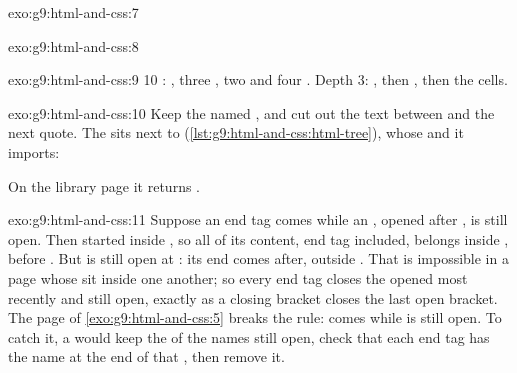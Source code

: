 \begin{solution}{exo:g9:html-and-css:7}
\label{lst:g9:html-and-css:sol-places}
\end{solution}

\begin{solution}{exo:g9:html-and-css:8}
\label{lst:g9:html-and-css:sol-h2}
\end{solution}

\begin{solution}{exo:g9:html-and-css:9}
10 : , three , two  and four .
Depth 3: , then , then the cells.
\end{solution}

\begin{solution}{exo:g9:html-and-css:10}
Keep the  named , and cut out the text between
 and the next quote. The  sits next to 
(\cref{lst:g9:html-and-css:html-tree}), whose  and  it imports:

\label{lst:g9:html-and-css:sol-links}

On the library page it returns .
\end{solution}

\begin{solution}{exo:g9:html-and-css:11}
Suppose an end tag  comes while an  , opened after
, is still open. Then  started inside , so all of its
content, end tag included, belongs inside , before . But
 is still open at : its end comes after, outside .
That is impossible in a page whose  sit inside one another; so every
end tag closes the  opened most recently and still open, exactly as a
closing bracket closes the last open bracket. The page of
\cref{exo:g9:html-and-css:5} breaks the rule:  comes while
 is still open. To catch it, a  would keep the  of the
names still open, check that each end tag has the name at the end of that
, then remove it.
\end{solution}

